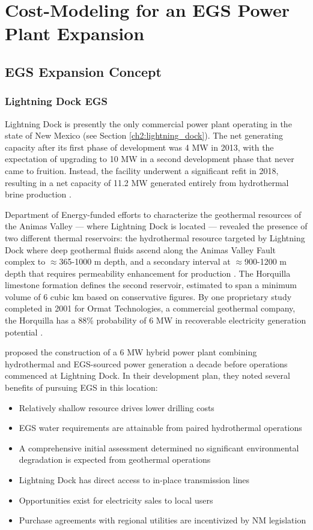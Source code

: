 \chapter{Cost-Modeling for an EGS Power Plant Expansion}\label{ch4:cm_prep}
\section{EGS Expansion Concept}\label{ch4:cm_concept}
\subsection{Lightning Dock EGS}\label{ch4:lightning_dock_egs}
Lightning Dock is presently the only commercial power plant operating in the state of New Mexico (see Section \ref{ch2:lightning_dock}). The net generating capacity after its first phase of development was 4 MW in 2013, with the expectation of upgrading to 10 MW in a second development phase that never came to fruition. Instead, the facility underwent a significant refit in 2018, resulting in a net capacity of 11.2 MW generated entirely from hydrothermal brine production \citep{bonafin_repowering_2019}.

Department of Energy-funded efforts to characterize the geothermal resources of the Animas Valley --- where Lightning Dock is located --- revealed the presence of two different thermal reservoirs: the hydrothermal resource targeted by Lightning Dock where deep geothermal fluids ascend along the Animas Valley Fault complex to $\approx$365-1000 m depth, and a secondary interval at $\approx$900-1200 m depth that requires permeability enhancement for production \citep{schochet_development_2001}. The Horquilla limestone formation defines the second reservoir, estimated to span a minimum volume of 6 cubic km based on conservative figures. By one proprietary study completed in 2001 for Ormat Technologies, a commercial geothermal company, the Horquilla has a 88\% probability of 6 MW in recoverable electricity generation potential \citep{schochet_development_2001}.

\citet{schochet_development_2001} proposed the construction of a 6 MW hybrid power plant combining hydrothermal and EGS-sourced power generation a decade before operations commenced at Lightning Dock. In their development plan, they noted several benefits of pursuing EGS in this location:
\begin{itemize}[itemsep=2pt]\label{ch4:ld_egs_support}
    \item Relatively shallow resource drives lower drilling costs
    \item EGS water requirements are attainable from paired hydrothermal operations
    \item A comprehensive initial assessment determined no significant environmental degradation is expected from geothermal operations
    \item Lightning Dock has direct access to in-place transmission lines  
    \item Opportunities exist for electricity sales to local users
    \item Purchase agreements with regional utilities are incentivized by NM legislation
\end{itemize}

